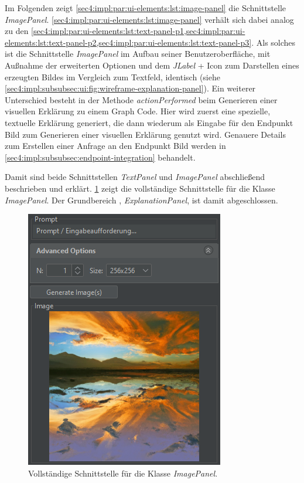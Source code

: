 Im Folgenden zeigt \cref{sec4:impl:par:ui-elements:lst:image-panel} die Schnittstelle \textit{ImagePanel}.
\cref{sec4:impl:par:ui-elements:lst:image-panel} verhält sich dabei analog zu den \cref{sec4:impl:par:ui-elements:lst:text-panel-p1,sec4:impl:par:ui-elements:lst:text-panel-p2,sec4:impl:par:ui-elements:lst:text-panel-p3}.
Als solches ist die Schnittstelle \textit{ImagePanel} im Aufbau seiner Benutzeroberfläche, mit Außnahme der erweiterten Optionen und dem \textit{JLabel} + Icon zum Darstellen eines erzeugten Bildes im Vergleich zum Textfeld, identisch (siehe \cref{sec4:impl:subsubsec:ui:fig:wireframe-explanation-panel}).
Ein weiterer Unterschied besteht in der Methode \textit{actionPerformed} beim Generieren einer visuellen Erklärung zu einem Graph Code.
Hier wird zuerst eine spezielle, textuelle Erklärung generiert, die dann wiederum als Eingabe für den Endpunkt Bild zum Generieren einer visuellen Erklärung genutzt wird.
Genauere Details zum Erstellen einer Anfrage an den Endpunkt Bild werden in \cref{sec4:impl:subsubsec:endpoint-integration} behandelt.



Damit sind beide Schnittstellen \textit{TextPanel} und \textit{ImagePanel} abschließend beschrieben und erklärt.
\cref{sec4:impl:par:ui-elements:fig:wireframe-image-complete} zeigt die vollständige Schnittstelle für die Klasse \textit{ImagePanel}.
Der Grundbereich , \textit{ExplanationPanel}, ist damit abgeschlossen.

\begin{figure}[!ht]
  \includegraphics{chapter/chapter_4/wireframe-impl-image-complete}
  \caption{Vollständige Schnittstelle für die Klasse \textit{ImagePanel}.}
  \label{sec4:impl:par:ui-elements:fig:wireframe-image-complete}
\end{figure}

